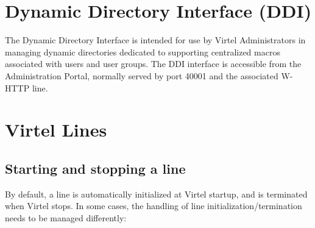 \documentclass[letterpaper,10pt,english]{sphinxmanual}
\begin{document}
\begin{sphinxVerbatim}[commandchars=\\\{\}]
       
      

    
        
\end{sphinxVerbatim}


\ignorespaces 

\chapter{Dynamic Directory Interface (DDI)}
\label{\detokenize{Customization:dynamic-directory-interface-ddi}}\label{\detokenize{Customization:index-47}}
The Dynamic Directory Interface is intended for use by Virtel Administrators in managing dynamic directories dedicated to supporting centralized macros associated with users and user groups. The DDI interface is accessible from the Administration Portal, normally served by port 40001 and the associated W-HTTP line.



\ignorespaces 

\chapter{Virtel Lines}
\label{\detokenize{Customization:virtel-lines}}\label{\detokenize{Customization:index-48}}
\ignorespaces 

\section{Starting and stopping a line}
\label{\detokenize{Customization:starting-and-stopping-a-line}}\label{\detokenize{Customization:index-49}}
By default, a line is automatically initialized at Virtel startup, and is terminated when Virtel stops. In some cases, the handling of line initialization/termination needs to be managed differently:
\end{document}
